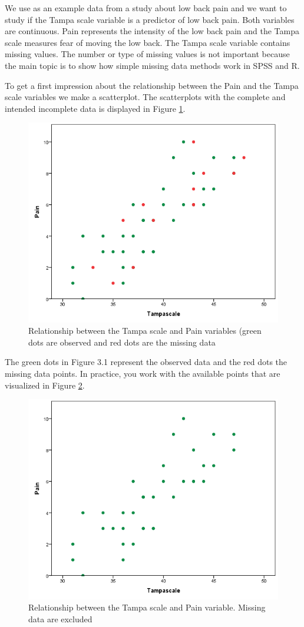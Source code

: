 \documentclass[
]{book}
\begin{document}
We use as an example data from a study about low back pain and we want to study if the Tampa scale variable is a predictor of low back pain. Both variables are continuous. Pain represents the intensity of the low back pain and the Tampa scale measures fear of moving the low back. The Tampa scale variable contains missing values. The number or type of missing values is not important because the main topic is to show how simple missing data methods work in SPSS and R.

To get a first impression about the relationship between the Pain and the Tampa scale variables we make a scatterplot. The scatterplots with the complete and intended incomplete data is displayed in Figure \ref{fig:fig3-1}.

\begin{figure}

{\centering \includegraphics[width=0.7\linewidth]{images/fig3.2a} 

}

\caption{Relationship between the Tampa scale and Pain variables (green dots are observed and red dots are the missing data}\label{fig:fig3-1}
\end{figure}

The green dots in Figure 3.1 represent the observed data and the red dots the missing data points. In practice, you work with the available points that are visualized in Figure \ref{fig:fig3-2}.

\begin{figure}

{\centering \includegraphics[width=0.7\linewidth]{images/fig3.2b} 

}

\caption{Relationship between the Tampa scale and Pain variable. Missing data are excluded}\label{fig:fig3-2}
\end{figure}
\end{document}
